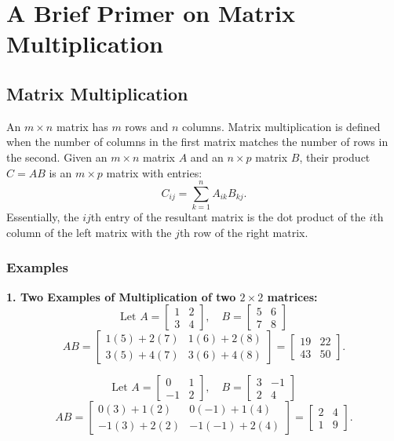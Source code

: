 \setcounter{chapter}{1}
\chapter*{A Brief Primer on Matrix Multiplication}
\addtocounter{chapter}{1} %

\setcounter{section}{0}
\section{Matrix Multiplication}
\label{sec:MatrixMult}
An $m\times n$ matrix has $m$ rows and $n$ columns. Matrix multiplication is defined when the number of columns in the first matrix matches the number of rows in the second. Given an \( m \times n \) matrix \( A \) and an \( n \times p \) matrix \( B \), their product \( C = AB \) is an \( m \times p \) matrix with entries:
\[
C_{ij} = \sum_{k=1}^{n} A_{ik} B_{kj}.
\]
Essentially, the $ij$th entry of the resultant matrix is the dot product of the $i$th column of the left matrix  with the $j$th row of the right matrix.
\subsection{Examples}

\textbf{1. Two Examples of Multiplication of two \( 2 \times 2 \) matrices:}
\[
\text{Let }A = \begin{bmatrix} 1 & 2 \\ 3 & 4 \end{bmatrix}, \quad 
B = \begin{bmatrix} 5 & 6 \\ 7 & 8 \end{bmatrix}
\]
\[
AB = \begin{bmatrix} 1(5) + 2(7) & 1(6) + 2(8) \\ 3(5) + 4(7) & 3(6) + 4(8) \end{bmatrix}
= \begin{bmatrix} 19 & 22 \\ 43 & 50 \end{bmatrix}.
\]

\[
\text{Let }A = \begin{bmatrix} 0 & 1 \\ -1 & 2 \end{bmatrix}, \quad 
B = \begin{bmatrix} 3 & -1 \\ 2 & 4 \end{bmatrix}
\]
\[
AB = \begin{bmatrix} 0(3) + 1(2) & 0(-1) + 1(4) \\ -1(3) + 2(2) & -1(-1) + 2(4) \end{bmatrix}
= \begin{bmatrix} 2 & 4 \\ 1 & 9 \end{bmatrix}.
\]

